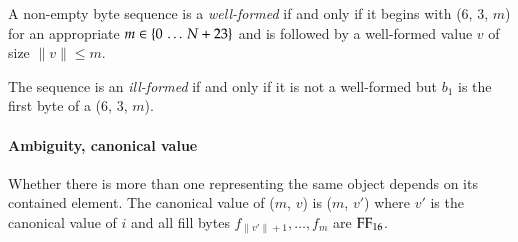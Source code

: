 A non-empty byte sequence  is a \emph{well-formed}
\DborAllocatedValue{} if and only if
it begins with \DborNaturalToken*($6$, $3$, $m$) for an appropriate $m \in \{0 \,\ldots\, N + 23\}$
and is followed by a well-formed value $v$ of size $\|v\| \le m$.

The sequence is an \emph{ill-formed} \DborAllocatedValue{} if and only if it is not a well-formed
\DborSequenceValue{} but $b_1$ is the first byte of a \DborNaturalToken*($6$, $3$, $m$).

\paragraph{Ambiguity, canonical value}

Whether there is more than one \DborAllocatedValue{} representing the same object depends on its
contained element.
The canonical value of \DborAllocatedValue($m$, $v$) is
\DborSequenceValue($m$, $v'$) where $v'$ is the canonical value of $i$
and all fill bytes $f_{\|v'\| + 1}, \ldots, f_m$ are $\mathrm{FF}_{16}$.
